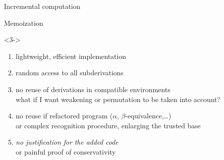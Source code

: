 \documentclass{beamer}
\theoremstyle{example}
\begin{document}
\begin{frame}[fragile]{Incremental computation}
\begin{block}{Memoization}
\begin{overlayarea}{\textwidth}{.7\textheight}
    \begin{onlyenv}<3->
      \begin{enumerate}
      \item<3->[\itplus] lightweight, efficient implementation
      \item<4->[\itplus] random access to all subderivations
      \item<5->[\itminus] no reuse of derivations in compatible
        environments \\
        {\footnotesize what if I want \eg weakening or
          permutation to be taken into account?}
      \item<6->[\itminus] no reuse if refactored program ($\alpha$,
        $\beta$-equivalence,\ldots) \\
        {\footnotesize or complex recognition procedure, enlarging the
          trusted base}
      \item<7->[\itminus] {\large\it no justification for the added code} \\
        {\footnotesize or painful proof of conservativity}
      \end{enumerate}

    \end{onlyenv}
    \end{overlayarea}
\end{block}
\end{frame}

\end{document}
